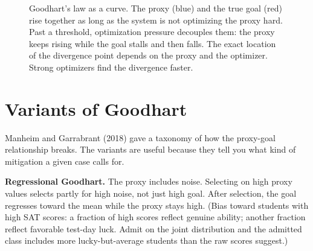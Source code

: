 \begin{figure}[h]
\centering
{}
\caption{Goodhart's law as a curve. The proxy (blue) and the true goal (red) rise together as long as the system is not optimizing the proxy hard. Past a threshold, optimization pressure decouples them: the proxy keeps rising while the goal stalls and then falls. The exact location of the divergence point depends on the proxy and the optimizer. Strong optimizers find the divergence faster.}
\label{fig:goodhart-curve}
\end{figure}

\section*{Variants of Goodhart}

Manheim and Garrabrant (2018) gave a taxonomy of how the proxy-goal relationship breaks. The variants are useful because they tell you what kind of mitigation a given case calls for.

\textbf{Regressional Goodhart.} The proxy includes noise. Selecting on high proxy values selects partly for high noise, not just high goal. After selection, the goal regresses toward the mean while the proxy stays high. (Bias toward students with high SAT scores: a fraction of high scores reflect genuine ability; another fraction reflect favorable test-day luck. Admit on the joint distribution and the admitted class includes more lucky-but-average students than the raw scores suggest.)

